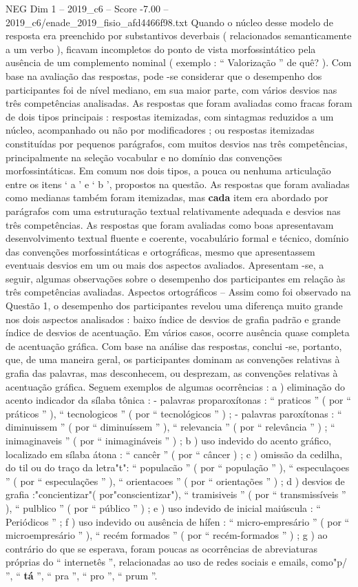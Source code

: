 \begin{textsample}{NEG Dim 1 – 2019\_c6 – Score -7.00 – 2019\_c6/enade\_2019\_fisio\_afd4466f98.txt}
Quando o núcleo desse modelo de resposta era preenchido por substantivos deverbais ( relacionados semanticamente a um verbo ), ficavam incompletos do ponto de vista morfossintático pela ausência de um complemento nominal ( exemplo : “ Valorização ” de quê? ).
Com base na avaliação das respostas, pode -se considerar que o desempenho dos participantes foi de nível mediano, em sua maior parte, com vários desvios nas três competências analisadas.
As respostas que foram avaliadas como fracas foram de dois tipos principais : respostas itemizadas, com sintagmas reduzidos a um núcleo, acompanhado ou não por modificadores ; ou respostas itemizadas constituídas por pequenos parágrafos, com muitos desvios nas três competências, principalmente na seleção vocabular e no domínio das convenções morfossintáticas.
Em comum nos dois tipos, a pouca ou nenhuma articulação entre os itens ‘ a ’ e ‘ b ’, propostos na questão.
As respostas que foram avaliadas como medianas também foram itemizadas, mas \textbf{cada} item era abordado por parágrafos com uma estruturação textual relativamente adequada e desvios nas três competências.
As respostas que foram avaliadas como boas apresentavam desenvolvimento textual fluente e coerente, vocabulário formal e técnico, domínio das convenções morfossintáticas e ortográficas, mesmo que apresentassem eventuais desvios em um ou mais dos aspectos avaliados.
Apresentam -se, a seguir, algumas observações sobre o desempenho dos participantes em relação às três competências avaliadas.
Aspectos ortográficos – Assim como foi observado na Questão 1, o desempenho dos participantes revelou uma diferença muito grande nos dois aspectos analisados : baixo índice de desvios de grafia padrão e grande índice de desvios de acentuação.
Em vários casos, ocorre ausência quase completa de acentuação gráfica.
Com base na análise das respostas, conclui -se, portanto, que, de uma maneira geral, os participantes dominam as convenções relativas à grafia das palavras, mas desconhecem, ou desprezam, as convenções relativas à acentuação gráfica.
Seguem exemplos de algumas ocorrências : a ) eliminação do acento indicador da sílaba tônica : - palavras proparoxítonas : “ praticos ” ( por “ práticos ” ), “ tecnologicos ” ( por “ tecnológicos ” ) ; - palavras paroxítonas : “ diminuissem ” ( por “ diminuíssem ” ), “ relevancia ” ( por “ relevância ” ) ; “ inimaginaveis ” ( por “ inimagináveis ” ) ; b ) uso indevido do acento gráfico, localizado em sílaba átona : “ cancêr ” ( por “ câncer ) ; c ) omissão da cedilha, do til ou do traço da letra"t": “ populacão ” ( por “ população ” ), “ especulaçoes ” ( por “ especulações ” ), “ orientacoes ” ( por “ orientações ” ) ; d ) desvios de grafia :"concientizar"( por"conscientizar"), “ tramisiveis ” ( por “ transmissíveis ” ), “ pulblico ” ( por “ público ” ) ; e ) uso indevido de inicial maiúscula : “ Periódicos ” ; f ) uso indevido ou ausência de hífen : “ micro-empresário ” ( por “ microempresário ” ), “ recém formados ” ( por “ recém-formados ” ) ; g ) ao contrário do que se esperava, foram poucas as ocorrências de abreviaturas próprias do “ internetês ”, relacionadas ao uso de redes sociais e emails, como"p/ ”, “ \textbf{tá} ”, “ pra ”, “ pro ”, “ prum ”.

\end{textsample}
